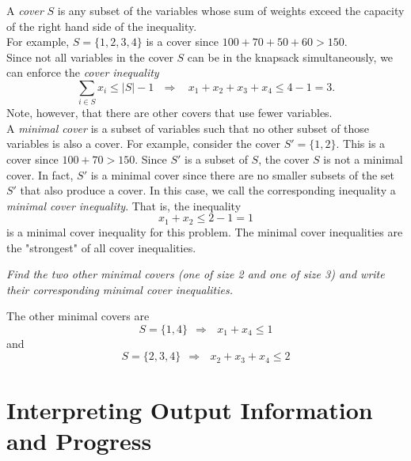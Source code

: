 A \emph{cover} $S$ is any subset of the variables whose sum of weights exceed the capacity of the right hand side of the inequality.\\
For example, $S = \{1,2,3,4\}$ is a cover since $100 + 70 + 50 + 60 > 150$.\\
Since not all variables in the cover $S$ can be in the knapsack simultaneously, we can enforce the \emph{cover inequality}
\begin{equation}
\sum_{i \in S} x_i \leq |S| - 1 \ \ \ \Rightarrow \ \ \ \ x_1 + x_2 + x_3 + x_4 \leq 4 - 1 = 3.
\end{equation}
Note, however, that there are other covers that use fewer variables.\\

A \emph{minimal cover} is a subset of variables such that no other subset of those variables is also a cover.  For example, consider the cover $S' = \{1,2\}$.  This is a cover since $100 + 70 > 150$.  Since $S'$ is a subset of $S$, the cover $S$ is not a minimal cover.  In fact, $S'$ is a minimal cover since there are no smaller subsets of the set $S'$ that also produce a cover.
In this case, we call the corresponding inequality a \emph{minimal cover inequality}.  That is, the inequality
\begin{equation}
x_1 + x_2 \leq 2 - 1 = 1
\end{equation}
is a minimal cover inequality for this problem.   The minimal cover inequalities are the "strongest" of all cover inequalities.

\emph{Find the two other minimal covers (one of size 2 and one of size 3) and write their corresponding minimal cover inequalities.}

\begin{solution}{}{}{}
The other minimal covers are 
\begin{equation}
S = \{1,4\} \ \ \Rightarrow \ \ \ x_1 + x_4 \leq 1
\end{equation}
and
\begin{equation}
S = \{2,3,4\} \ \ \Rightarrow \ \ \ x_2 + x_3 + x_4 \leq 2
\end{equation}
\end{solution}


\section{Interpreting Output Information and Progress}



